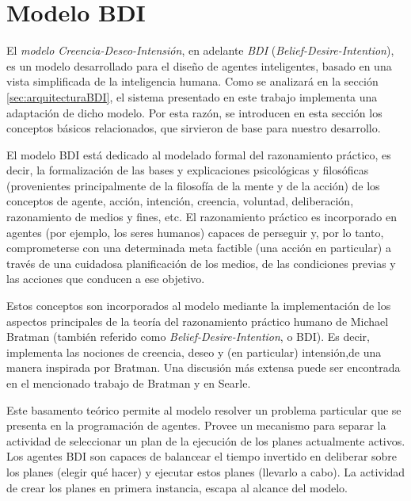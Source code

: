 \section{Modelo BDI}

\label{sec:preliminaresBDI}

El \textit{modelo Creencia-Deseo-Intensión}\cite{Rao:1991}, en adelante \textit{BDI} 
(\textit{Belief-Desire-Inten\-tion}),
es un modelo desarrollado para el diseño de agentes inteligentes, basado en una
vista simplificada de la inteligencia humana. Como se analizará en la sección 
\ref{sec:arquitecturaBDI}, el sistema presentado en este trabajo implementa una 
adaptación de dicho modelo. Por esta razón, se introducen en esta sección los 
conceptos básicos relacionados, que sirvieron de base para nuestro desarrollo.

El modelo BDI está dedicado al modelado formal del razonamiento práctico, es 
decir, la formalización de las bases y explicaciones psicológicas y filosóficas 
(provenientes principalmente de la filosofía de la mente y de la acción) de los 
conceptos de agente, acción, intención, creencia, voluntad, deliberación, 
razonamiento de medios y fines, etc. El razonamiento práctico es incorporado 
en agentes (por ejemplo, los seres humanos) capaces de perseguir y, por lo tanto, 
comprometerse con una determinada meta factible (una acción en particular) 
a través de una cuidadosa planificación de los medios, de las condiciones previas 
y las acciones que conducen a ese objetivo. 

Estos conceptos son incorporados al modelo mediante la implementación de los 
aspectos principales de la teoría del razonamiento práctico humano de Michael Bratman \cite{citeulike:2063638}
(también referido como \textit{Belief-Desire-Intention}, o BDI). Es decir, implementa 
las nociones de creencia, deseo y (en particular) intensión,de una manera inspirada 
por Bratman. Una discusión más extensa puede ser encontrada en el mencionado 
trabajo de Bratman y en Searle\cite{searle:1985}.

Este basamento teórico permite al modelo resolver un problema particular que 
se presenta en la programación de agentes. Provee un mecanismo para separar la 
actividad de seleccionar un plan de la ejecución de los planes actualmente activos.
Los agentes BDI son capaces de balancear el tiempo invertido en deliberar sobre los
planes (elegir qué hacer) y ejecutar estos planes (llevarlo a cabo). La actividad 
de crear los planes en primera instancia, escapa al alcance del modelo.


